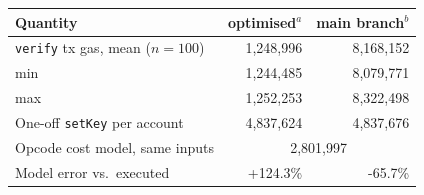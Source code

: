 \begin{tabular}{lrr}
\toprule
Quantity & optimised$^a$ & main branch$^b$ \\
\midrule
\texttt{verify} tx gas, mean ($n=100$) & 1{,}248{,}996 & 8{,}168{,}152 \\
\quad min & 1{,}244{,}485 & 8{,}079{,}771 \\
\quad max & 1{,}252{,}253 & 8{,}322{,}498 \\
One-off \texttt{setKey} per account & 4{,}837{,}624 & 4{,}837{,}676 \\
Opcode cost model, same inputs & \multicolumn{2}{c}{2{,}801{,}997} \\
Model error vs.\ executed & +124.3\% & -65.7\% \\
\bottomrule
\end{tabular}
